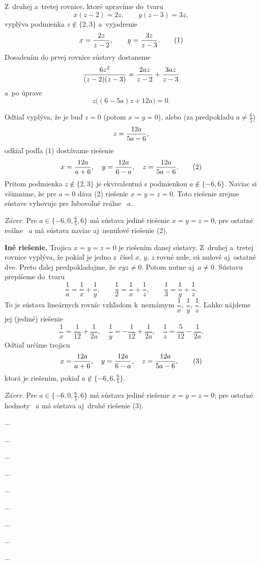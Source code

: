 {%
Z~druhej a~tretej rovnice, ktoré upravíme do~tvaru
$$
x(z-2)=2z, \qquad y(z-3)=3z,
$$
vyplýva podmienka $z\notin\{2,3\}$ a~vyjadrenie
$$
x={2z\over z-2}, \qquad y={3z\over z-3} . \tag1
$$
Dosadením do prvej rovnice sústavy dostaneme
$$
{6z^2\over (z-2)(z-3)}={2az\over z-2}+{3az\over z-3}
$$
a~po úprave
$$
z\bigl((6-5a)z+12a\bigr)=0.
$$

Odtiaľ vyplýva, že je buď $z=0$ (potom $x=y=0$), alebo (za predpokladu
$a\ne\frac65$)
$$
z={12a\over5a-6},
$$
odkiaľ podľa (1) dostávame riešenie
$$
x={12a\over a+6},\quad
y={12a\over 6-a},\quad
z={12a\over5a-6}.                          \tag2
$$
Pritom podmienka $z\notin\{2,3\}$ je ekvivalentná s podmienkou
$a\notin\{-6,6\}$. Naviac si všimnime, že pre $a=0$ dáva (2)
riešenie $x=y=z=0$. Toto riešenie zrejme sústave vyhovuje pre
ľubovoľné reálne~ $a$.

{\it Záver}. Pre $a\in\{-6,0,\frac65,6\}$ má sústava jediné
riešenie $x=y=z=0$, pre ostatné reálne~ $a$ má sústava naviac
aj~nenulové riešenie (2).

\medskip
{\bf Iné riešenie.}
Trojica $x=y=z=0$ je riešením danej sústavy. Z~druhej a~tretej
rovnice vyplýva, že pokiaľ je jedno z~čísel $x$, $y$, $z$ rovné
nule, sú nulové aj~ostatné dve. Preto ďalej predpokladajme, že
$xyz\ne0$. Potom nutne aj~$a\ne0$. Sústavu prepíšeme do~tvaru
$$
\frac1a=\frac1x+\frac1y,\qquad
\frac12=\frac1x+\frac1z,\qquad
\frac13=\frac1y+\frac1z       .
$$
To je sústava lineárnych rovníc vzhľadom k~neznámym $\dfrac1x$,
$\dfrac1y$, $\dfrac1z$. Ľahko nájdeme jej (jediné) riešenie
$$
\frac1x=\frac1{12}+\frac1{2a},\quad
\frac1y=-\frac1{12}+\frac1{2a},\quad
\frac1z=\frac5{12}-\frac1{2a}.
$$
Odtiaľ určíme trojicu
$$
x={12a\over a+6},\quad
y={12a\over 6-a},\quad
z={12a\over5a-6},                          \tag3
$$
ktorá je riešením, pokiaľ $a\notin\{-6,6,\frac65\}$.

{\it Záver}. Pre $a\in\{-6,0,\frac65,6\}$ má sústava jediné
riešenie $x=y=z=0$; pre ostatné hodnoty~ $a$ má sústava
aj~druhé riešenie (3).
}

{%
...}

{%
...}

{%
...}

{%
...}

{%
...}

{%
...}

{%
...}

{%
...}

{%
...}


